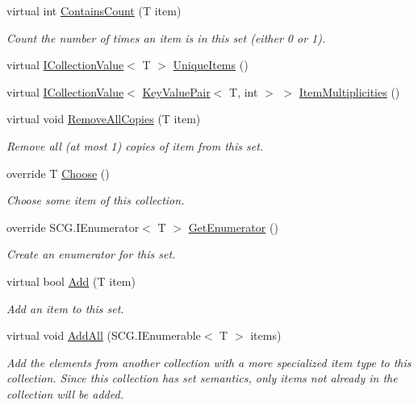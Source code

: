 \begin{DoxyCompactItemize}
virtual int \hyperlink{class_c5_1_1_hash_set_a6ae7c12192030c64a6268546bdb21fbe}{Contains\+Count} (T item)
\begin{DoxyCompactList}\small\item\em Count the number of times an item is in this set (either 0 or 1). \end{DoxyCompactList}\item 
virtual \hyperlink{interface_c5_1_1_i_collection_value}{I\+Collection\+Value}$<$ T $>$ \hyperlink{class_c5_1_1_hash_set_a8f1963ae2661d4b9b064f88124789c76}{Unique\+Items} ()
\item 
virtual \hyperlink{interface_c5_1_1_i_collection_value}{I\+Collection\+Value}$<$ \hyperlink{struct_c5_1_1_key_value_pair}{Key\+Value\+Pair}$<$ T, int $>$ $>$ \hyperlink{class_c5_1_1_hash_set_ae8e2ee2134a81967efe6fef79d67a0fc}{Item\+Multiplicities} ()
\item 
virtual void \hyperlink{class_c5_1_1_hash_set_a07eacbcc5850774881dd596676e6b134}{Remove\+All\+Copies} (T item)
\begin{DoxyCompactList}\small\item\em Remove all (at most 1) copies of item from this set. \end{DoxyCompactList}\item 
override T \hyperlink{class_c5_1_1_hash_set_a6bac17b51f5b2a569a0df8e0c46fe78f}{Choose} ()
\begin{DoxyCompactList}\small\item\em Choose some item of this collection. \end{DoxyCompactList}\item 
override S\+C\+G.\+I\+Enumerator$<$ T $>$ \hyperlink{class_c5_1_1_hash_set_a4c404a22695abc0f6b47bf74d3d34034}{Get\+Enumerator} ()
\begin{DoxyCompactList}\small\item\em Create an enumerator for this set. \end{DoxyCompactList}\item 
virtual bool \hyperlink{class_c5_1_1_hash_set_a0700ad4332214ac5d74f3a197bfd8774}{Add} (T item)
\begin{DoxyCompactList}\small\item\em Add an item to this set. \end{DoxyCompactList}\item 
virtual void \hyperlink{class_c5_1_1_hash_set_aabee06dcd4be050a024c507e781d338e}{Add\+All} (S\+C\+G.\+I\+Enumerable$<$ T $>$ items)
\begin{DoxyCompactList}\small\item\em Add the elements from another collection with a more specialized item type to this collection. Since this collection has set semantics, only items not already in the collection will be added. \end{DoxyCompactList}\item 

\end{DoxyCompactItemize}
